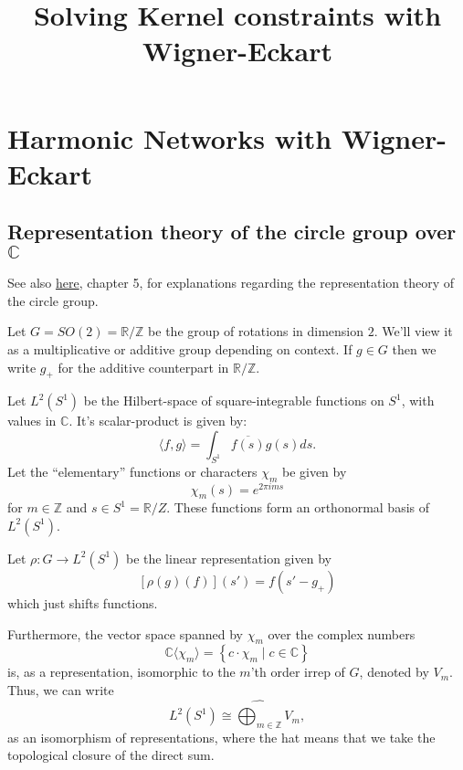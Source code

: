\documentclass[12pt, a4paper]{article}
\title{Solving Kernel constraints with Wigner-Eckart}
\date{}
\theoremstyle{plain}
\theoremstyle{definition}
\theoremstyle{remark}
\newcommand{\Z}{\mathds{Z}}
\newcommand{\R}{\mathds{R}}
\newcommand{\C}{\mathds{C}}
\begin{document}
\maketitle

\tableofcontents

\section{Harmonic Networks with Wigner-Eckart}

\subsection{Representation theory of the circle group over $\C$}

See also \href{https://www.google.de/url?sa=t&rct=j&q=&esrc=s&source=web&cd=2&ved=2ahUKEwjmqryykejnAhVCjqQKHelWD64QFjABegQIBhAB&url=https%3A%2F%2Fpeople.math.ethz.ch%2F~kowalski%2Frepresentation-theory.pdf&usg=AOvVaw26KQERYwYqIMiDaXbxsZ8U}{here}, chapter 5, for explanations regarding the representation theory of the circle group.

Let $G = SO(2) = \R/\Z$ be the group of rotations in dimension $2$. We'll view it as a multiplicative or additive group depending on context. If $g \in G$ then we write $g_+$ for the additive counterpart in $\R/\Z$.

Let $L^2(S^1)$ be the Hilbert-space of square-integrable functions on $S^1$, with values in $\C$. It's scalar-product is given by:
\begin{equation*}
\langle f, g \rangle = \int_{S^1} \overline{f(s)} g(s) ds.
\end{equation*}
Let the ``elementary'' functions or characters $\chi_m$ be given by
\begin{equation*}
\chi_m(s) = e^{2 \pi i m s}
\end{equation*}
for $m \in \Z$ and $s \in S^1 = \R/Z$. These functions form an orthonormal basis of $L^2(S^1)$. 

Let $\rho: G \to L^2(S^1)$ be the linear representation given by
\begin{equation*}
\left[\rho(g)(f)\right](s') = f(s' - g_{+})
\end{equation*}
which just shifts functions. 

Furthermore, the vector space spanned by $\chi_m$ over the complex numbers
\begin{equation*}
\C\langle \chi_m\rangle = \left\lbrace c \cdot \chi_m \mid c \in \C \right\rbrace
\end{equation*}
is, as a representation, isomorphic to the $m$'th order irrep of $G$, denoted by $V_m$. Thus, we can write
\begin{equation*}
L^2(S^1) \cong \widehat{\bigoplus_{m \in \Z}} V_m,
\end{equation*}
as an isomorphism of representations, where the hat means that we take the topological closure of the direct sum.
\end{document}
